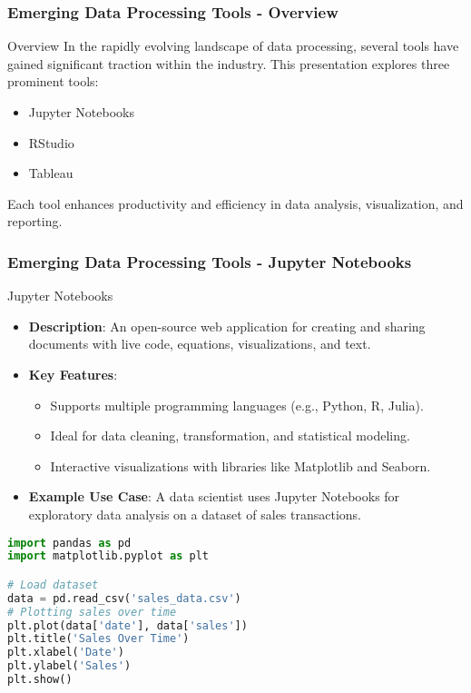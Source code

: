 \documentclass[aspectratio=169]{beamer}
\begin{document}
\begin{frame}[fragile]
    \frametitle{Emerging Data Processing Tools - Overview}
    \begin{block}{Overview}
        In the rapidly evolving landscape of data processing, several tools have gained significant traction within the industry. This presentation explores three prominent tools:
        \begin{itemize}
            \item Jupyter Notebooks
            \item RStudio
            \item Tableau
        \end{itemize}
        Each tool enhances productivity and efficiency in data analysis, visualization, and reporting.
    \end{block}
\end{frame}

\begin{frame}[fragile]
    \frametitle{Emerging Data Processing Tools - Jupyter Notebooks}
    \begin{block}{Jupyter Notebooks}
        \begin{itemize}
            \item \textbf{Description}: An open-source web application for creating and sharing documents with live code, equations, visualizations, and text.
            \item \textbf{Key Features}:
                \begin{itemize}
                    \item Supports multiple programming languages (e.g., Python, R, Julia).
                    \item Ideal for data cleaning, transformation, and statistical modeling.
                    \item Interactive visualizations with libraries like Matplotlib and Seaborn.
                \end{itemize}
            \item \textbf{Example Use Case}:
                A data scientist uses Jupyter Notebooks for exploratory data analysis on a dataset of sales transactions.
        \end{itemize}
    \end{block}
    \begin{lstlisting}[language=Python, caption=Jupyter Notebook Example]
import pandas as pd
import matplotlib.pyplot as plt

# Load dataset
data = pd.read_csv('sales_data.csv')
# Plotting sales over time
plt.plot(data['date'], data['sales'])
plt.title('Sales Over Time')
plt.xlabel('Date')
plt.ylabel('Sales')
plt.show()
    \end{lstlisting}
\end{frame}
\end{document}
